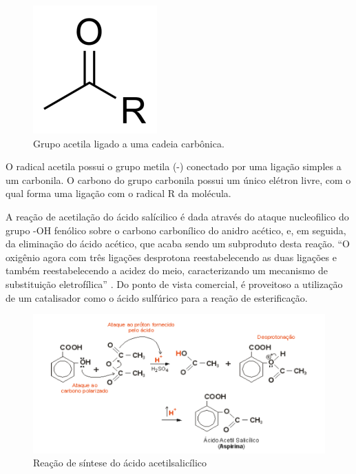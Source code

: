     \begin{figure}[H]
    \begin{center}
        \includegraphics[width=.4\textwidth]{figuras/im1.png}
    \end{center}
    \caption{Grupo acetila ligado a uma cadeia carbônica.}\label{fig:im1}
    \end{figure}
    
    O radical acetila possui o grupo metila (-) conectado por uma ligação simples a um carbonila. O
    carbono do grupo carbonila possui um único elétron livre, com o qual forma uma ligação com o radical R da
    molécula.

    A reação de acetilação do ácido salícilico é dada através do ataque nucleofilico do grupo -OH fenólico
    sobre o carbono carbonílico do anidro acético, e, em seguida, da eliminação do ácido acético, que acaba
    sendo um subproduto desta reação. “O oxigênio agora com três ligações desprotona reestabelecendo as duas
    ligações e também reestabelecendo a acidez do meio, caracterizando um mecanismo de substituição
    eletrofílica” \cite{lopes2011}. Do ponto de vista comercial, é proveitoso a utilização de um catalisador
    como o ácido sulfúrico para a reação de esterificação. \cite{PERUCH2013}
    
    \begin{figure}[H]
    \begin{center}
        \includegraphics[width=1.2\textwidth]{figuras/im2.png}
    \end{center}
    \caption{Reação de síntese do ácido acetilsalicílico}\label{fig:im2}%
    \end{figure}

